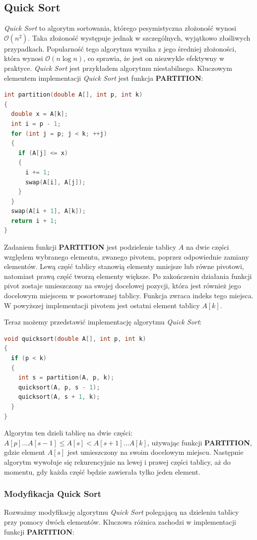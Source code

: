 \documentclass{article}
\newcommand{\bigO}{\mathcal{O}}
\begin{document}
\subsection{Quick Sort}
\textit{Quick Sort} to algorytm sortowania, którego pesymistyczna złożoność wynosi $\bigO(n^2)$. Taka złożoność występuje jednak w szczególnych, wyjątkowo złośliwych przypadkach. Popularność tego algorytmu wynika z jego średniej złożoności, która wynosi $\bigO(n \log n)$, co sprawia, że jest on niezwykle efektywny w praktyce. \textit{Quick Sort} jest przykładem algorytmu niestabilnego. Kluczowym elementem implementacji \textit{Quick Sort} jest funkcja \textbf{PARTITION}:
\begin{lstlisting}[style=mystyle, language=C++, caption={Implementacja \texttt{Partition}}, label={lst:partition}]
int partition(double A[], int p, int k)
{
  double x = A[k];
  int i = p - 1;
  for (int j = p; j < k; ++j)
  {
    if (A[j] <= x)
    {
      i += 1;
      swap(A[i], A[j]);
    }
  }
  swap(A[i + 1], A[k]);
  return i + 1;
}
\end{lstlisting}
Zadaniem funkcji \textbf{PARTITION} jest podzielenie tablicy $A$ na dwie części względem wybranego elementu, zwanego pivotem, poprzez odpowiednie zamiany elementów. Lewą część tablicy stanowią elementy mniejsze lub równe pivotowi, natomiast prawą część tworzą elementy większe. Po zakończeniu działania funkcji pivot zostaje umieszczony na swojej docelowej pozycji, która jest również jego docelowym miejscem w posortowanej tablicy. Funkcja zwraca indeks tego miejsca. W powyższej implementacji pivotem jest ostatni element tablicy $A[k]$. 

Teraz możemy przedstawić implementację algorytmu \textit{Quick Sort}:
\begin{lstlisting}[style=mystyle, language=C++, caption={Implementacja \textit{Quick Sort}}, label={lst:quick_sort}]
void quicksort(double A[], int p, int k)
{
  if (p < k)
  {
    int s = partition(A, p, k);
    quicksort(A, p, s - 1);
    quicksort(A, s + 1, k);
  }
}
\end{lstlisting}
Algorytm ten dzieli tablicę na dwie części: $A[p] \ldots A[s-1] \leq A[s] < A[s+1] \ldots A[k]$, używając funkcji \textbf{PARTITION}, gdzie element $A[s]$ jest umieszczony na swoim docelowym miejscu. Następnie algorytm wywołuje się rekurencyjnie na lewej i prawej części tablicy, aż do momentu, gdy każda część będzie zawierała tylko jeden element.

\subsubsection{Modyfikacja Quick Sort}
Rozważmy modyfikację algorytmu \textit{Quick Sort} polegającą na dzieleniu tablicy przy pomocy dwóch elementów. Kluczowa różnica zachodzi w implementacji funkcji \textbf{PARTITION}:
\end{document}
